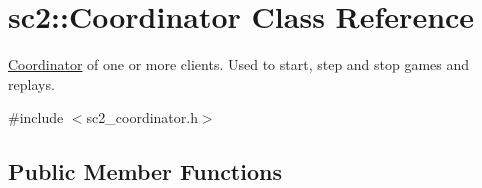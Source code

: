 \hypertarget{classsc2_1_1_coordinator}{}\section{sc2\+:\+:Coordinator Class Reference}
\label{classsc2_1_1_coordinator}


\hyperlink{classsc2_1_1_coordinator}{Coordinator} of one or more clients. Used to start, step and stop games and replays.  




{\ttfamily \#include $<$sc2\+\_\+coordinator.\+h$>$}

\subsection*{Public Member Functions}
